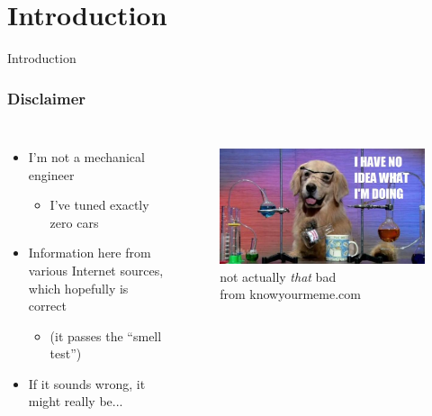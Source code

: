 \documentclass{beamer}
\begin{document}
\begin{frame}
\titlepage

\setcounter{tocdepth}{1}
\tableofcontents
\end{frame}


\section{Introduction} %
\begin{frame}
\centering \huge Introduction
\end{frame}

\begin{frame}
\frametitle{Disclaimer}
\begin{columns}[t]
  \begin{itemize}
    \item I'm not a mechanical engineer
    \begin{itemize}
      \item I've tuned exactly zero cars
    \end{itemize}
    \item Information here from various Internet sources, which hopefully is correct
    \begin{itemize}
      \item (it passes the ``smell test'')
    \end{itemize}
    \item If it sounds wrong, it might really be...
  \end{itemize}
  \begin{figure}
    \centering
    \includegraphics[width=1.0\columnwidth]{images-dis12/fa5} \\
    not actually \textit{that} bad \\
    {\scriptsize from knowyourmeme.com}
  \end{figure}
\end{columns}
\end{frame}
\end{document}
